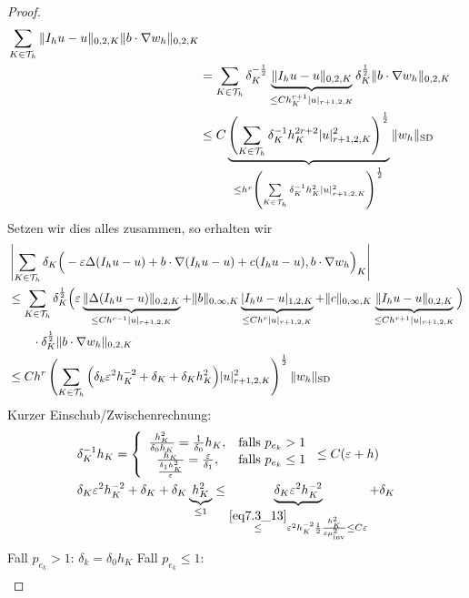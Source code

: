 \begin{proof}
\begin{align*}
		\sum\limits_{K\in\mathcal{T}_h}\Vert I_h u-u\Vert_{0,2,K}\Vert b\cdot\nabla w_h\Vert_{0,2,K}\\
		&=\sum\limits_{K\in\mathcal{T}_h}\delta_K^{-\frac{1}{2}}\underbrace{\Vert I_h u-u\Vert_{0,2,K}}_{\leq C h^{r+1}_K|u|_{r+1,2,K}}\delta_K^{\frac{1}{2}}\Vert b\cdot\nabla w_h\Vert_{0,2,K}\\
		&\leq C\underbrace{\left(\sum\limits_{K\in\mathcal{T}_h}\delta_K^{-1} h_K^{2r+2}|u|^2_{r+1,2,K}\right)^{\frac{1}{2}}}_{
			\leq h^r\left(\sum\limits_{K\in\mathcal{T}_h}\delta_K^{-1} h_K^2|u|^2_{r+1,2,K}\right)^{\frac{1}{2}}
		}\Vert w_h\Vert_{\text{SD}}
	\end{align*}
	Setzen wir dies alles zusammen, so erhalten wir
	\begin{align*}
		&\left|\sum\limits_{K\in\mathcal{T}_h}\delta_K\Big(-\varepsilon\Delta(I_h u-u)+b\cdot\nabla(I_h u-u)+c(I_h u-u),b\cdot\nabla w_h\Big)_K\right|\\
		&\leq\sum\limits_{K\in\mathcal{T}_h}\delta_K^{\frac{1}{2}}\Big(\varepsilon\underbrace{\Vert\Delta(I_h u-u)\Vert_{0,2,K}}_{\leq C h^{r-1}|u|_{r+1,2,K}}+\Vert b\Vert_{0,\infty,K}\underbrace{|I_h u-u|_{1,2,K}}_{\leq C h^r|u|_{r+1,2,K}}+\Vert c\Vert_{0,\infty,K}\underbrace{\Vert I_h u-u\Vert_{0,2,K}}_{\leq C h^{r+1}|u|_{r+1,2,K}}\Big)\\
		&\qquad\cdot\delta_K^{\frac{1}{2}}\Vert b\cdot\nabla w_h\Vert_{0,2,K}\\
		&\leq C h^r\left(\sum\limits_{K\in\mathcal{T}_h}\Big(\delta_k\varepsilon^2 h^{-2}_K+\delta_K+\delta_K h^2_K\Big)|u|^2_{r+1,2,K}\right)^{\frac{1}{2}}\Vert w_h\Vert_{\text{SD}}
	\end{align*}
	Kurzer Einschub/Zwischenrechnung:
	\begin{align*}
		&\delta_K^{-1} h_K=\left\lbrace\begin{array}{cl}
			\frac{h^2_K}{\delta_0 h_K}=\frac{1}{\delta_0}h_K, & \text{falls } p_{e_k}>1\\
			\frac{h_K}{\frac{\delta_1 h_K^2}{\varepsilon}}=\frac{\varepsilon}{\delta_1}, &\text{falls } p_{e_k}\leq1
		\end{array}\right.
		\leq C(\varepsilon+h)\\
		&\delta_K\varepsilon^2 h_K^{-2}+\delta_K+\delta_K\underbrace{h_K^2}_{\leq1}
		\leq\underbrace{\delta_K\varepsilon^2 h_K^{-2}}_{
			\overset{\eqref{eq7.3_13}}{\leq}\varepsilon^2 h_K^{-2}\frac{1}{2}\frac{h_K^2}{\varepsilon \mu^2_{\text{inv}}}\leq C\varepsilon
		}+\delta_K
	\end{align*}
	Fall $p_{e_k}>1$: $\delta_k=\delta_0 h_K$\nl
	Fall $p_{e_k}\leq1$:
	\begin{align*}

\end{align*}
\end{proof}
